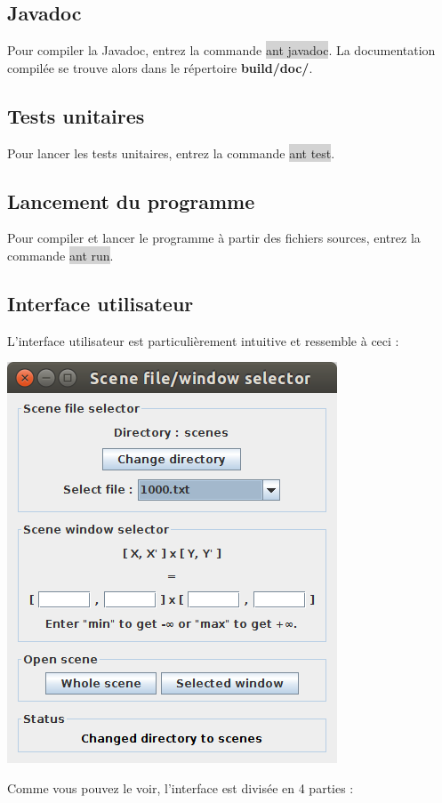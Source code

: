 \documentclass[10pt,a4paper]{article}
\begin{document}
\subsection{Javadoc}
Pour compiler la Javadoc, entrez la commande \colorbox{lightgray}{ant javadoc}. La documentation compilée se trouve alors dans le répertoire \textbf{build/doc/}.

\subsection{Tests unitaires}
Pour lancer les tests unitaires, entrez la commande \colorbox{lightgray}{ant test}.

\subsection{Lancement du programme}
Pour compiler et lancer le programme à partir des fichiers sources, entrez la commande \colorbox{lightgray}{ant run}.

\subsection{Interface utilisateur}
L'interface utilisateur est particulièrement intuitive et ressemble à ceci :

\centerline{\includegraphics[scale=0.5]{images/ui.png}}

Comme vous pouvez le voir, l'interface est divisée en 4 parties :
\end{document}
